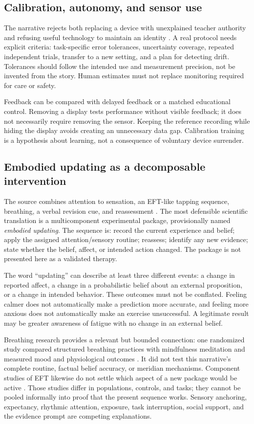 \subsection{Calibration, autonomy, and sensor use}
The narrative rejects both replacing a device with unexplained teacher authority and refusing useful technology to maintain an identity . A real protocol needs explicit criteria: task-specific error tolerances, uncertainty coverage, repeated independent trials, transfer to a new setting, and a plan for detecting drift. Tolerances should follow the intended use and measurement precision, not be invented from the story. Human estimates must not replace monitoring required for care or safety.

Feedback can be compared with delayed feedback or a matched educational control. Removing a display tests performance without visible feedback; it does not necessarily require removing the sensor. Keeping the reference recording while hiding the display avoids creating an unnecessary data gap. Calibration training is a hypothesis about learning, not a consequence of voluntary device surrender.

\subsection{Embodied updating as a decomposable intervention}
The source combines attention to sensation, an EFT-like tapping sequence, breathing, a verbal revision cue, and reassessment . The most defensible scientific translation is a multicomponent experimental package, provisionally named \emph{embodied updating}. The sequence is: record the current experience and belief; apply the assigned attention/sensory routine; reassess; identify any new evidence; state whether the belief, affect, or intended action changed. The package is not presented here as a validated therapy.

The word ``updating'' can describe at least three different events: a change in reported affect, a change in a probabilistic belief about an external proposition, or a change in intended behavior. These outcomes must not be conflated. Feeling calmer does not automatically make a prediction more accurate, and feeling more anxious does not automatically make an exercise unsuccessful. A legitimate result may be greater awareness of fatigue with no change in an external belief.

Breathing research provides a relevant but bounded connection: one randomized study compared structured breathing practices with mindfulness meditation and measured mood and physiological outcomes \cite{balban}. It did not test this narrative's complete routine, factual belief accuracy, or meridian mechanisms. Component studies of EFT likewise do not settle which aspect of a new package would be active \cite{waite,church}. Those studies differ in populations, controls, and tasks; they cannot be pooled informally into proof that the present sequence works. Sensory anchoring, expectancy, rhythmic attention, exposure, task interruption, social support, and the evidence prompt are competing explanations.

